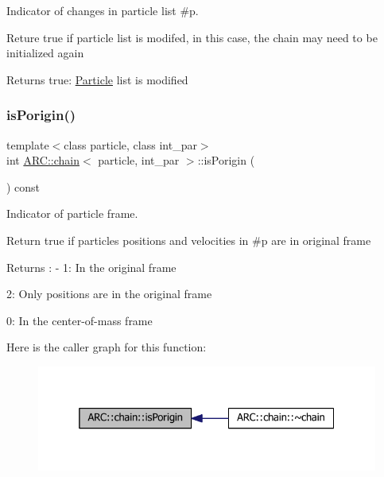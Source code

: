 Indicator of changes in particle list \#p. 

Reture true if particle list is modifed, in this case, the chain may need to be initialized again \begin{DoxyReturn}{Returns}
true\+: \hyperlink{classParticle}{Particle} list is modified 
\end{DoxyReturn}
\hypertarget{classARC_1_1chain_a7de218a1874b150ee44a05aa9d7b7b6d}{}\label{classARC_1_1chain_a7de218a1874b150ee44a05aa9d7b7b6d} 
\subsubsection{\texorpdfstring{is\+Porigin()}{isPorigin()}}
{\footnotesize\ttfamily template$<$class particle, class int\+\_\+par$>$ \\
int \hyperlink{classARC_1_1chain}{A\+R\+C\+::chain}$<$ particle, int\+\_\+par $>$\+::is\+Porigin (\begin{DoxyParamCaption}{ }\end{DoxyParamCaption}) const\hspace{0.3cm}{\ttfamily [inline]}}



Indicator of particle frame. 

Return true if particles positions and velocities in \#p are in original frame \begin{DoxyReturn}{Returns}
\+: -\/ 1\+: In the original frame
\begin{DoxyItemize}
\item 2\+: Only positions are in the original frame
\item 0\+: In the center-\/of-\/mass frame 
\end{DoxyItemize}
\end{DoxyReturn}
Here is the caller graph for this function\+:
\nopagebreak
\begin{figure}[H]
\begin{center}
\leavevmode
\includegraphics[width=325pt]{classARC_1_1chain_a7de218a1874b150ee44a05aa9d7b7b6d_icgraph}
\end{center}
\end{figure}
\hypertarget{classARC_1_1chain_aff3cd92c840d1bbbc903a8a07eb079d0}{}\label{classARC_1_1chain_aff3cd92c840d1bbbc903a8a07eb079d0} 
